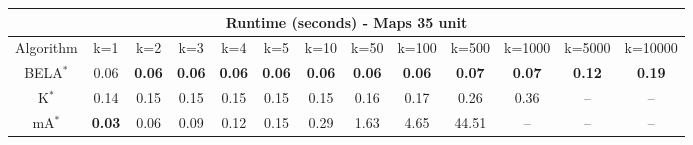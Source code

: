\begin{tabular}{c|cccccccccccc}\toprule
\multicolumn{13}{c}{Runtime (seconds) - Maps 35 unit}\\ \midrule
Algorithm & k=1 & k=2 & k=3 & k=4 & k=5 & k=10 & k=50 & k=100 & k=500 & k=1000 & k=5000 & k=10000 \\ \midrule
BELA$^*$ & 0.06 & \textbf{0.06} & \textbf{0.06} & \textbf{0.06} & \textbf{0.06} & \textbf{0.06} & \textbf{0.06} & \textbf{0.06} & \textbf{0.07} & \textbf{0.07} & \textbf{0.12} & \textbf{0.19} \\
K$^*$ & 0.14 & 0.15 & 0.15 & 0.15 & 0.15 & 0.15 & 0.16 & 0.17 & 0.26 & 0.36 & -- & -- \\
mA$^*$ & \textbf{0.03} & 0.06 & 0.09 & 0.12 & 0.15 & 0.29 & 1.63 & 4.65 & 44.51 & -- & -- & -- \\ \bottomrule 
\end{tabular}
